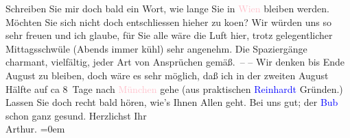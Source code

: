                Schreiben Sie mir doch bald ein Wort, {\pb}wie lange Sie
               in \textcolor{pink}{Wien}{}\ledrightnote{\textcolor{pink}{Wien}} bleiben werden. Möchten Sie sich nicht doch
               entschliessen hieher zu ko{\geminationm}en? Wir würden uns so sehr
               freuen und ich glaube, für Sie alle wäre die Luft hier, trotz gelegentlicher
               Mittagsschwüle (Abends immer kühl) sehr angenehm. Die Spaziergänge charmant,
               vielfältig, jeder {\pb}Art von Ansprüchen gemäß. –\pend
           \pstart
           – Wir denken bis Ende August zu bleiben, doch wäre es sehr möglich, daß
               ich in der zweiten August Hälfte auf ca 8 Tage nach \textcolor{pink}{München}{}\ledrightnote{\textcolor{pink}{München}} gehe (aus praktischen \textcolor{blue}{Reinhardt}{}\ledrightnote{\textcolor{blue}{Max Reinhardt}}
               Gründen.)\pend
           \pstart
           Lassen Sie doch recht bald hören, wie’s Ihnen Allen geht. Bei uns gut; der \textcolor{blue}{Bub}{} schon {\pb}ganz gesund.\pend
           \pstart
           Herzlichst Ihr{\\[\baselineskip]}\spacefill\mbox{Arthur.}\pend
           \leftskip=0em{}\endnumbering{}  
      
